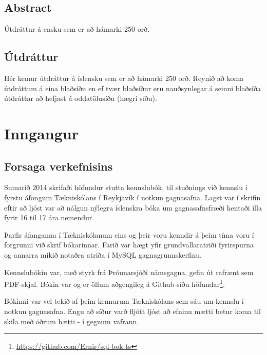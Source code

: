 \documentclass[a4paper,12pt,twoside,BCOR=10mm]{scrbook}
\begin{document}
\setcounter{page}{5}
\section*{\huge Abstract}
Útdráttur á ensku sem er að hámarki 250 orð.
\vfill \vspace*{1cm}
\section*{\huge Útdráttur}
Hér kemur útdráttur á íslensku sem er að hámarki 250 orð. Reynið að koma útdráttum á eina blaðsíðu en ef tvær blaðsíður eru nauðsynlegar á seinni blaðsíða útdráttar að hefjast á oddatölusíðu (hægri síðu).
\vfill
\newpage

\tableofcontents
\listoffigures
\listoftables
\listoflistings

% 
% 

\chapter{Inngangur}

\setcounter{page}{1}

\section{Forsaga verkefnisins}
Sumarið 2014 skrifaði höfundur stutta kennslubók, til stuðnings við kennslu í fyrstu áföngum Tækniskólans í Reykjavík í notkun gagnasafna. Lagst var í skrifin eftir að ljóst var að nálgun nýlegra íslenskra bóka um gagnasafnsfræði\cite{sigurdur2003, jon2008} hentaði illa fyrir 16 til 17 ára nemendur.

Þarfir áfanganna í Tækniskólanum eins og þeir voru kenndir á þeim tíma voru í forgrunni við skrif bókarinnar. Farið var hægt yfir grundvallaratriði fyrirspurna og annarra mikið notaðra atriða í MySQL gagnagrunnskerfinu.

Kennslubókin var, með styrk frá Þróunarsjóði námsgagna, gefin út rafrænt sem PDF-skjal. Bókin var og er öllum aðgengileg á Github-síðu höfundar\footnote{\url{https://github.com/Ernir/sql-bok-ts}}. 

Bókinni var vel tekið af þeim kennurum Tækniskólans sem sáu um kennslu í notkun gagnasafna. Engu að síður varð fljótt ljóst að efninu mætti betur koma til skila með öðrum hætti - í gegnum vafrann.
\end{document}

